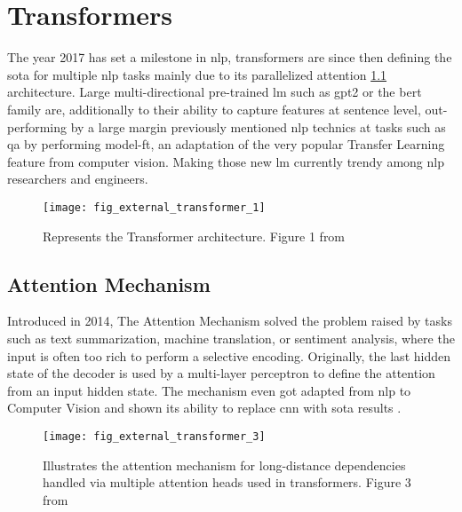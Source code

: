 \section{Transformers}
\label{nlp:transformers}
The year 2017 has set a milestone in \gls{nlp}, transformers \autocite{paper:journals/corr/VaswaniSPUJGKP17} are since then defining the \gls{sota} for multiple \gls{nlp} tasks mainly due to its parallelized attention \ref{nlp:attention} architecture. Large multi-directional pre-trained \gls{lm} such as \gls{gpt2} or the \gls{bert} family are, additionally to their ability to capture features at sentence level, out-performing by a large margin previously mentioned \gls{nlp} technics at tasks such as \gls{qa} by performing \gls{model-ft}, an adaptation of the very popular Transfer Learning feature from computer vision. Making those new \gls{lm} currently trendy among \gls{nlp} researchers and engineers.

\begin{figure}
    \centering
    \texttt{[image: fig\_external\_transformer\_1]}
    \caption{Represents the Transformer architecture. Figure 1 from \autocite{paper:journals/corr/VaswaniSPUJGKP17}}
    \label{fig:fig_external_transformer_1}
\end{figure}

\subsection{Attention Mechanism}
\label{nlp:attention}
Introduced in 2014, The Attention Mechanism \autocite{paper:bahdanau2014neural} solved the problem raised by tasks such as text summarization, machine translation, or sentiment analysis, where the input is often too rich to perform a selective encoding. Originally, the last hidden state of the decoder is used by a multi-layer perceptron to define the attention from an input hidden state. The mechanism even got adapted from \gls{nlp} to Computer Vision and shown its ability to replace \gls{cnn} with \gls{sota} results \autocite{paper:journals/corr/abs-1906-05909}.

\begin{figure}
    \centering
    \texttt{[image: fig\_external\_transformer\_3]}
    \caption{Illustrates the attention mechanism for long-distance dependencies handled via multiple attention heads used in transformers. Figure 3 from \autocite{paper:journals/corr/VaswaniSPUJGKP17}}
    \label{fig:fig_external_transformer_3}
\end{figure}

